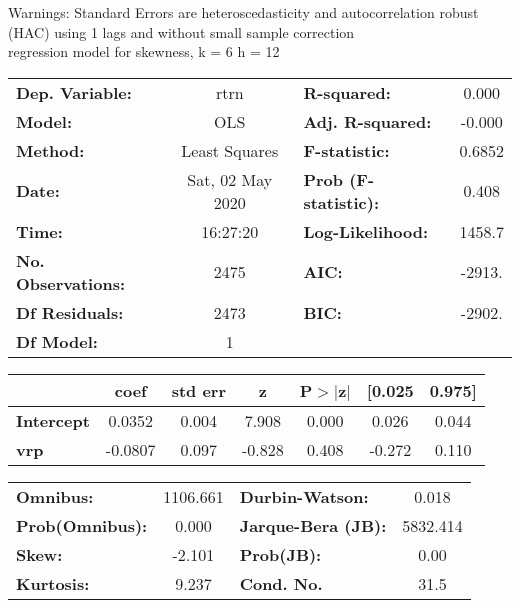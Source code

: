 Warnings: \newline
 [1] Standard Errors are heteroscedasticity and autocorrelation robust (HAC) using 1 lags and without small sample correction\\ 

regression model for skewness, k = 6 h = 12\begin{center}
\begin{tabular}{lclc}
\toprule
\textbf{Dep. Variable:}    &       rtrn       & \textbf{  R-squared:         } &     0.000   \\
\textbf{Model:}            &       OLS        & \textbf{  Adj. R-squared:    } &    -0.000   \\
\textbf{Method:}           &  Least Squares   & \textbf{  F-statistic:       } &    0.6852   \\
\textbf{Date:}             & Sat, 02 May 2020 & \textbf{  Prob (F-statistic):} &    0.408    \\
\textbf{Time:}             &     16:27:20     & \textbf{  Log-Likelihood:    } &    1458.7   \\
\textbf{No. Observations:} &        2475      & \textbf{  AIC:               } &    -2913.   \\
\textbf{Df Residuals:}     &        2473      & \textbf{  BIC:               } &    -2902.   \\
\textbf{Df Model:}         &           1      & \textbf{                     } &             \\
\bottomrule
\end{tabular}
\begin{tabular}{lcccccc}
                   & \textbf{coef} & \textbf{std err} & \textbf{z} & \textbf{P$> |$z$|$} & \textbf{[0.025} & \textbf{0.975]}  \\
\midrule
\textbf{Intercept} &       0.0352  &        0.004     &     7.908  &         0.000        &        0.026    &        0.044     \\
\textbf{vrp}       &      -0.0807  &        0.097     &    -0.828  &         0.408        &       -0.272    &        0.110     \\
\bottomrule
\end{tabular}
\begin{tabular}{lclc}
\textbf{Omnibus:}       & 1106.661 & \textbf{  Durbin-Watson:     } &    0.018  \\
\textbf{Prob(Omnibus):} &   0.000  & \textbf{  Jarque-Bera (JB):  } & 5832.414  \\
\textbf{Skew:}          &  -2.101  & \textbf{  Prob(JB):          } &     0.00  \\
\textbf{Kurtosis:}      &   9.237  & \textbf{  Cond. No.          } &     31.5  \\
\bottomrule
\end{tabular}
\end{center}

